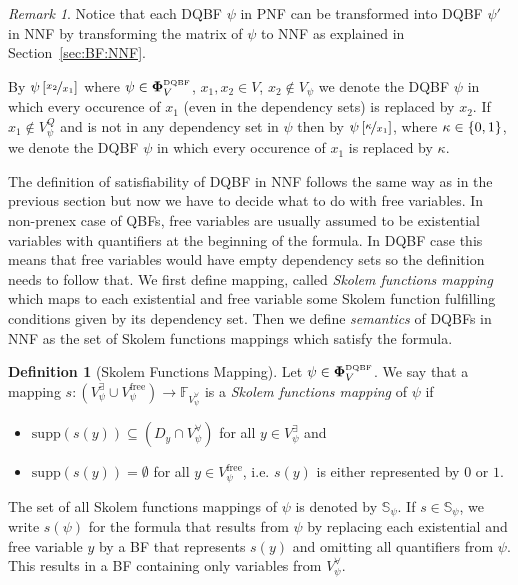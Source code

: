 \documentclass[
  digital, %
  color,
  twoside, %
  table,   %
  nolof,     %
  nolot,     %
]{fithesis3}
\let\setbuilder\set
\newcommand{\simpleset}[1]{\{{#1}\}}
\renewcommand{\set}[1]{\normalexpandarg\IfSubStr{#1}{|}{\setbuilder{#1}}{\simpleset{#1}}}
\theoremstyle{definition}
\newtheorem{definition}{Definition}
\theoremstyle{remark}
\newtheorem*{remark}{Remark}
\newcommand{\substitute}[2]{\left[ \nicefrac{#2}{#1} \right]}
\newcommand{\DQBF}[1]{\mathbf{\Phi}_{#1}^{\normalfont{\text{\tiny DQBF}}}}
\newcommand{\BFuncs}[1]{\mathbb{F}_{#1}}
\newcommand{\evars}[1]{V_{#1}^{\exists}}
\newcommand{\uvars}[1]{V_{#1}^{\forall}}
\newcommand{\fvars}[1]{V_{#1}^{\mathrm{free}}}
\newcommand{\qvars}[1]{V_{#1}^{Q}}
\newcommand{\supp}[1]{\mathrm{supp}(#1)}
\newcommand{\Scands}[1]{\mathbb{S}_{#1}}
\begin{document}
\begin{remark}
Notice that each DQBF $\psi$ in PNF can be transformed into DQBF $\psi'$ in NNF by transforming the matrix of $\psi$ to NNF as explained in Section~\ref{sec:BF:NNF}.
\end{remark}

By $\psi\substitute{x_1}{x_2}$ where $\psi \in \DQBF{V}$, $x_1, x_2 \in V$, $x_2 \not\in V_{\psi}$ we denote the DQBF $\psi$ in which every occurence of $x_1$ (even in the dependency sets) is replaced by $x_2$. If $x_1 \not\in \qvars{\psi}$ and is not in any dependency set in $\psi$ then by $\psi\substitute{x_1}{\kappa}$, where $\kappa\in\set{0,1}$, we denote the DQBF $\psi$ in which every occurence of $x_1$ is replaced by $\kappa$.

The definition of satisfiability of DQBF in NNF follows the same way as in the previous section but now we have to decide what to do with free variables. In non-prenex case of QBFs, free variables are usually assumed to be existential variables with quantifiers at the beginning of the formula. In DQBF case this means that free variables would have empty dependency sets so the definition needs to follow that. We first define mapping, called \emph{Skolem functions mapping} which maps to each existential and free variable some Skolem function fulfilling conditions given by its dependency set. Then we define \emph{semantics} of DQBFs in NNF as the set of Skolem functions mappings which satisfy the formula.

\begin{definition}[Skolem Functions Mapping]
  Let $\psi \in \DQBF{V}$. We say that a mapping $s\colon (\evars{\psi} \cup \fvars{\psi}) \to \BFuncs{\uvars{\psi}}$ is a \emph{Skolem functions mapping} of $\psi$ if
  \begin{itemize}
      \item $\supp{s(y)} \subseteq (D_y \cap \uvars{\psi})$ for all $y \in \evars{\psi}$ and
      \item $\supp{s(y)} = \emptyset$ for all $y \in \fvars{\psi}$, i.e. $s(y)$ is either represented by $0$ or $1$.
  \end{itemize}
\end{definition}

The set of all Skolem functions mappings of $\psi$ is denoted by $\Scands{\psi}$. If $s \in \Scands{\psi}$, we write $s(\psi)$ for the formula that results from $\psi$ by replacing each existential and free variable $y$ by a BF that represents $s(y)$ and omitting all quantifiers from $\psi$. This results in a BF containing only variables from $\uvars{\psi}$.
\end{document}
